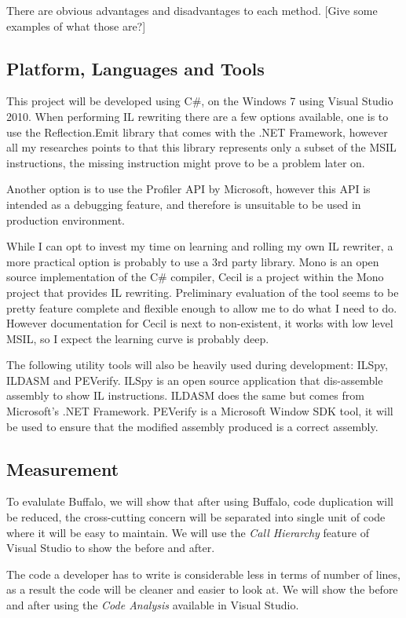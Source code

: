 There are obvious advantages and disadvantages to each method. [Give some examples of what those are?]

\subsection{Platform, Languages and Tools}
This project will be developed using C\#, on the Windows 7 using Visual Studio 2010. When performing IL rewriting there are a few options available, one is to use the Reflection.Emit library that comes with the .NET Framework, however all my researches points to that this library represents only a subset of the MSIL instructions, the missing instruction might prove to be a problem later on.

Another option is to use the Profiler API by Microsoft, however this API is intended as a debugging feature, and therefore is unsuitable to be used in production environment.

While I can opt to invest my time on learning and rolling my own IL rewriter, a more practical option is probably to use a 3rd party library. Mono is an open source implementation of the C\# compiler, Cecil is a project within the Mono project that provides IL rewriting. Preliminary evaluation of the tool seems to be pretty feature complete and flexible enough to allow me to do what I need to do. However documentation for Cecil is next to non-existent, it works with low level MSIL, so I expect the learning curve is probably deep.

The following utility tools will also be heavily used during development: ILSpy, ILDASM and PEVerify. ILSpy is an open source application that dis-assemble assembly to show IL instructions. ILDASM does the same but comes from Microsoft’s .NET Framework. PEVerify is a Microsoft Window SDK tool, it will be used to ensure that the modified assembly produced is a correct assembly.

\subsection{Measurement}
To evalulate Buffalo, we will show that after using Buffalo, code duplication will be reduced, the cross-cutting concern will be separated into single unit of code where it will be easy to maintain. We will use the {\em Call Hierarchy} feature of Visual Studio to show the before and after. 

The code a developer has to write is considerable less in terms of number of lines, as a result the code will be cleaner and easier to look at. We will show the before and after using the {\em Code Analysis} available in Visual Studio.

